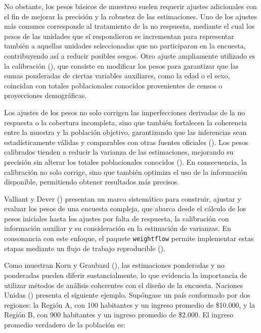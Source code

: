 \documentclass[
  spanish,
  11pt,
  letterpaper,
  oneside,
  open=any]{scrbook}
\begin{document}
No obstante, los pesos básicos de muestreo suelen requerir ajustes
adicionales con el fin de mejorar la precisión y la robustez de las
estimaciones. Uno de los ajustes más comunes corresponde al tratamiento
de la no respuesta, mediante el cual los pesos de las unidades que sí
respondieron se incrementan para representar también a aquellas unidades
seleccionadas que no participaron en la encuesta, contribuyendo así a
reducir posibles sesgos. Otro ajuste ampliamente utilizado es la
calibración (),
que consiste en modificar los pesos para garantizar que las sumas
ponderadas de ciertas variables auxiliares, como la edad o el sexo,
coincidan con totales poblacionales conocidos provenientes de censos o
proyecciones demográficas.

Los ajustes de los pesos no solo corrigen las imperfecciones derivadas
de la no respuesta o la cobertura incompleta, sino que también
fortalecen la coherencia entre la muestra y la población objetivo,
garantizando que las inferencias sean estadísticamente válidas y
comparables con otras fuentes oficiales
().
Los pesos calibrados tienden a reducir la varianza de las estimaciones,
mejorando su precisión sin alterar los totales poblacionales conocidos
(). En
consecuencia, la calibración no solo corrige, sino que también optimiza
el uso de la información disponible, permitiendo obtener resultados más
precisos.

Valliant y Dever () presentan un
marco sistemático para construir, ajustar y evaluar los pesos de una
encuesta compleja, que abarca desde el cálculo de los pesos iniciales
hasta los ajustes por falta de respuesta, la calibración con información
auxiliar y su consideración en la estimación de varianzas. En
consonancia con este enfoque, el paquete \texttt{weightflow} permite
implementar estas etapas mediante un flujo de trabajo reproducible
().

Como muestran Korn y Graubard (),
las estimaciones ponderadas y no ponderadas pueden diferir
sustancialmente, lo que evidencia la importancia de utilizar métodos de
análisis coherentes con el diseño de la encuesta. Naciones Unidas
() presenta el siguiente ejemplo.
Supóngase un país conformado por dos regiones: la Región A, con 100
habitantes y un ingreso promedio de \$10.000, y la Región B, con 900
habitantes y un ingreso promedio de \$2.000. El ingreso promedio
verdadero de la población es:
\end{document}

